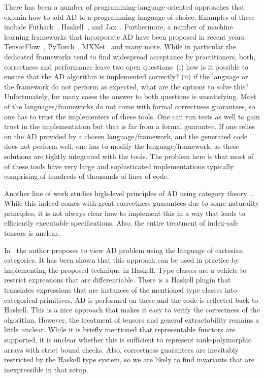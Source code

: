 There has been a number of programming-language-oriented approaches that explain
how to add AD to a programming language of choice. Examples of these include
Futhark~\cite{futhark/sc22ad}, Haskell~\cite{ad-haskell}, and
Jax~\cite{ad-jax}. Furthermore, a number of machine learning
frameworks that incorporate AD have been proposed in recent years: TensorFlow~\cite{ad-tf},
PyTorch~\cite{ad-pytorch}, MXNet~\cite{ad-mxnet} and many more.
While in particular the dedicated frameworks tend to find widespread 
acceptance by practitioners, both, correctness and performance leave
two open questions: (i) how is it possible to
ensure that the AD algorithm is implemented correctly?
(ii) if the
language or the framework do not perform as expected, what are the
options to solve this?  Unfortunately, for many cases the answer to
both questions is unsatisfying.  Most of the languages/frameworks do not
come with formal correctness guarantees, so one has to trust the
implementers of these tools.  One can run tests as well to gain trust 
in the implementation but that is far from a 
formal guarantee.  If one relies
on the AD provided by a chosen language/framework, and the generated code does not
perform well, one has to modify the language/framework, as these solutions
are tightly integrated with the tools. The problem here is that most of of these tools
have very large and sophisticated implementations typically comprising
of hundreds of thousands of lines of code.

Another line of work studies high-level principles of AD using
category theory~\cite{ad-theor1, ad-theor2, ad-theor3}.
While this indeed comes with great correctness guarantees due to
some naturality principles, it is not always clear how to implement
this in a way that leads to efficiently executable specifications.  Also, the
entire treatment of index-safe tensors is unclear.

In~\cite{ad-elliott} the author proposes to view AD problem using
the language of cartesian categories.  It has been shown that
this approach can be used in practice by implementing the proposed
technique in Haskell.  Type classes are a vehicle to restrict expressions
that are differentiable.  There is a Haskell plugin that translates
expressions that are instances of the mentioned type classes into
categorical primitives, AD is performed on these and the code is reflected
back to Haskell.  This is a nice approach that makes it easy
to verify the correctness of the algorithm.  However, the treatment
of tensors and general extractability remains a little unclear.
While it is briefly mentioned that representable functors
are supported, it is unclear whether this is sufficient to
represent rank-polymorphic arrays with strict bound checks.
Also, correctness guarantees are inevitably restricted by the
Haskell type system, so we are likely to find invariants that
are inexpressible in that setup.

